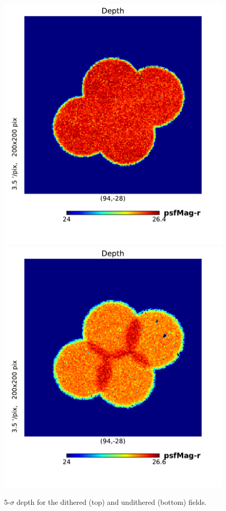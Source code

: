 \documentclass[\docopts]{\docclass}
\begin{document}
\begin{figure}
\centering
\includegraphics[width=0.9\columnwidth]{imsim_dithered_depth_snr_stars.pdf}
\includegraphics[width=0.9\columnwidth]{imsim_undithered_depth_snr_stars.pdf}
\caption{5-$\sigma$ depth for the dithered (top) and undithered (bottom) fields.}
\label{fig:depth_maps}
\end{figure}
\end{document}
